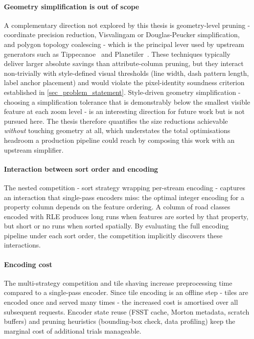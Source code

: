 \paragraph{Geometry simplification is out of scope}
A complementary direction not explored by this thesis is geometry-level pruning - coordinate precision reduction, Visvalingam or Douglas-Peucker simplification, and polygon topology coalescing - which is the principal lever used by upstream generators such as Tippecanoe~\cite{FeltTippecanoe2026} and Planetiler~\cite{OnthegomapPlanetiler2026}.
These techniques typically deliver larger absolute savings than attribute-column pruning, but they interact non-trivially with style-defined visual thresholds (line width, dash pattern length, label anchor placement) and would violate the pixel-identity soundness criterion established in \cref{sec_problem_statement}.
Style-driven geometry simplification - choosing a simplification tolerance that is demonstrably below the smallest visible feature at each zoom level - is an interesting direction for future work but is not pursued here.
The thesis therefore quantifies the size reductions achievable \emph{without} touching geometry at all, which understates the total optimisations headroom a production pipeline could reach by composing this work with an upstream simplifier.

\paragraph{Interaction between sort order and encoding}
The nested competition - sort strategy wrapping per-stream encoding - captures an interaction that single-pass encoders miss: the optimal integer encoding for a property column depends on the feature ordering.
A column of road classes encoded with \ac{RLE} produces long runs when features are sorted by that property, but short or no runs when sorted spatially.
By evaluating the full encoding pipeline under each sort order, the competition implicitly discovers these interactions.

\paragraph{Encoding cost}
The multi-strategy competition and tile shaving increase preprocessing time compared to a single-pass encoder.
Since tile encoding is an offline step - tiles are encoded once and served many times - the increased cost is amortised over all subsequent requests.
Encoder state reuse (\ac{FSST} cache, Morton metadata, scratch buffers) and pruning heuristics (bounding-box check, data profiling) keep the marginal cost of additional trials manageable.


